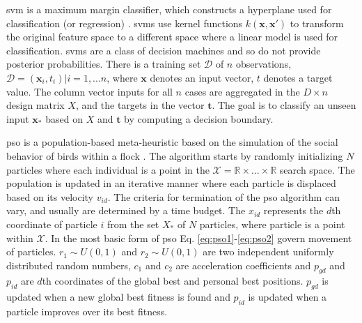 \documentclass[10pt,conference,a4paper]{IEEEtran}
\begin{document}



\ac{svm} is a maximum margin classifier, which constructs a hyperplane used for classification (or regression) \cite{Bishop:2006:PRM:1162264}. \acp{svm} use kernel functions $k(\mathbf{x},\mathbf{x'})$ to transform the original feature space to a different space where a linear model is used for classification. \acp{svm} are a class of decision machines and so do not provide posterior probabilities. There is a training set $\mathcal{D}$ of $n$ observations, $\mathcal{D}={(\mathbf{x}_i,t_{i}) | i = 1, ... n} $, where $\mathbf{x}$ denotes an input vector, $t$ denotes a target value. The column vector inputs for all $n$ cases are aggregated in the $D \times n$ design matrix $X$, and the targets in the vector $\mathbf{t}$. The goal is to classify an unseen input $\mathbf{x_{*}}$ based on $X$ and $\mathbf{t}$ by computing a decision boundary. 




\ac{pso} is a population-based meta-heuristic based on the simulation of the social behavior of birds within a flock \cite{VanDenBergh:2002:APS:935867}. The algorithm starts by randomly initializing $N$ particles where each individual is a point in the $\mathcal{X} = \mathbb{R} \times ... \times \mathbb{R}$ search space. The population is updated in an iterative manner where each particle is displaced based on its velocity $v_{id}$. The criteria for termination of the \ac{pso} algorithm can vary, and usually are determined by a time budget. The $x_{id}$ represents the $d$th coordinate of particle $i$ from the set $X_*$ of $N$ particles, where particle is a point within $\mathcal{X}$. In the most basic form of \ac{pso} Eq. \ref{eq:pso1}-\ref{eq:pso2} govern movement of particles. $r_1 \sim U(0,1)$ and $r_2 \sim U(0,1)$ are two independent uniformly distributed random numbers, $c_1$ and $c_2$ are acceleration coefficients and $p_{gd}$ and $p_{id}$ are $d$th coordinates of the global best and personal best positions. $p_{gd}$ is updated when a new global best fitness is found and $p_{id}$ is updated when a particle improves over its best fitness.
\end{document}
